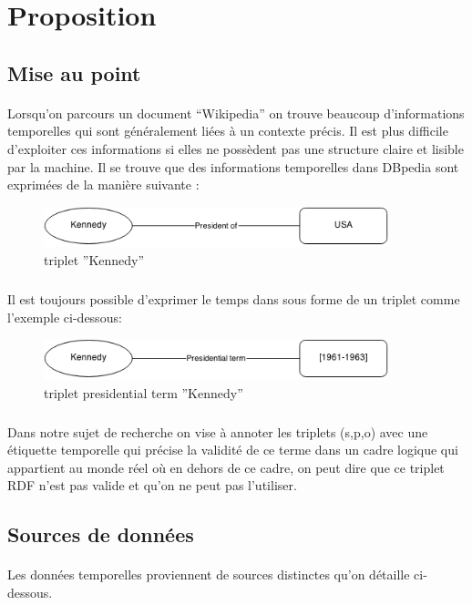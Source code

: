 \section*{Proposition}
\subsection*{Mise au point}
\paragraph{}
Lorsqu’on parcours un document “Wikipedia” on trouve beaucoup d’informations temporelles qui sont généralement liées à un contexte précis.
Il est plus difficile d’exploiter ces informations si elles ne possèdent pas une structure claire et lisible par la machine.
\newline
Il se trouve que des informations temporelles dans DBpedia sont exprimées de la manière suivante : 
\begin{figure}[H]
        \centering
                \centering
                \includegraphics[width=10cm]{ken.png}
               \caption{triplet ''Kennedy''}

\end{figure}
\subparagraph{}
Il est toujours possible d’exprimer le temps dans sous forme de un triplet comme l’exemple ci-dessous: 
\begin{figure}[H]
        \centering
                \centering
                \includegraphics[width=10cm]{presidterm.png}
               \caption{triplet presidential term ''Kennedy''}

\end{figure}
\subparagraph{}
Dans notre sujet de recherche on vise à annoter les triplets (s,p,o) avec une étiquette temporelle qui précise la validité de ce terme dans un cadre logique qui appartient au monde réel où en dehors de ce cadre, on peut dire que ce triplet RDF n’est pas valide et qu’on ne peut pas l’utiliser.
\subsection*{Sources de données}
\paragraph{}
Les données temporelles proviennent de sources distinctes qu’on détaille ci-dessous.
